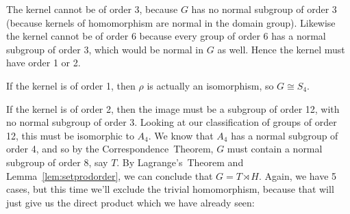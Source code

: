 The kernel cannot be of order 3, because \(G\) has no normal subgroup of order 3 (because kernels of homomorphism are
normal in the domain group).
Likewise the kernel cannot be of order 6 because every group of order 6 has a normal subgroup of order 3, which would be
normal in \(G\) as well.
Hence the kernel must have order 1 or 2.

If the kernel is of order 1, then \(\rho\) is actually an isomorphism, so \(G \cong S_4\).

If the kernel is of order 2, then the image must be a subgroup of order 12, with no normal subgroup of order 3.
Looking at our classification of groups of order 12, this must be isomorphic to \(A_4\).
We know that \(A_4\) has a normal subgroup of order 4, and so by the Correspondence~Theorem, \(G\) must contain a normal
subgroup of order 8, say \(T\).
By Lagrange's~Theorem and Lemma~\ref{lem:setprodorder}, we can conclude that \(G = T \rtimes H\).
Again, we have 5 cases, but this time we'll exclude the trivial homomorphism, because that will just give us the direct
product which we have already seen:


